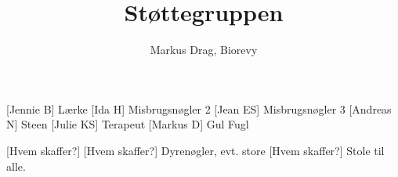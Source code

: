 \documentclass[a4paper,12pt]{article}
\title{Støttegruppen}
\author{Markus Drag, Biorevy}
\begin{document}
\maketitle

\begin{texxers}
\end{texxers}

\begin{roles}
	[Jennie B] Lærke
	[Ida H] Misbrugsnøgler 2
	[Jean ES] Misbrugsnøgler 3
	[Andreas N] Steen
	[Julie KS] Terapeut
	[Markus D] Gul Fugl
\end{roles}


\begin{props}
	[Hvem skaffer?] 
	[Hvem skaffer?] Dyrenøgler, evt. store
	[Hvem skaffer?] Stole til alle.
\end{props}
\end{document}
